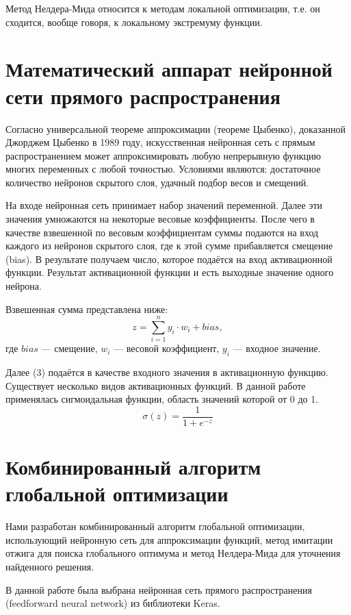 \documentclass[11pt, oneside, a4paper]{article}
\begin{document}
Метод Нелдера-Мида относится к методам локальной оптимизации, т.е. он сходится, вообще говоря, к локальному экстремуму функции. 

\section{Математический аппарат нейронной сети прямого распространения}

Согласно универсальной теореме аппроксимации (теореме Цыбенко), доказанной Джорджем Цыбенко в 1989 году, искусственная нейронная сеть с прямым распространением может аппроксимировать любую непрерывную функцию многих переменных с любой точностью. Условиями являются: достаточное количество нейронов скрытого слоя, удачный подбор весов и смещений.

На входе нейронная сеть принимает набор значений переменной. Далее эти значения умножаются на некоторые весовые коэффициенты. После чего в качестве взвешенной по весовым коэффициентам суммы подаются  на вход  каждого из нейронов скрытого слоя, где к этой сумме прибавляется смещение (bias). В результате получаем число, которое подаётся на вход активационной функции. Результат активационной функции и есть выходные значение одного нейрона.

Взвешенная сумма представлена ниже:
\begin{equation}
z = \sum_{i=1}^n y_i \cdot w_i + bias,
\end{equation}
где $bias$ --- смещение, $w_i$ --- весовой коэффициент, $y_i$ --- входное значение.

Далее (3) подаётся в качестве входного значения в активационную функцию. Существует несколько видов активационных функций. В данной работе применялась сигмоидальная функции, область значений которой от 0 до 1.
\begin{equation}
\sigma(z)= \frac{1}{1+e^{-z}}
\end{equation}

\section{Комбинированный алгоритм глобальной оптимизации}

Нами разработан комбинированный алгоритм глобальной оптимизации, использующий нейронную сеть для аппроксимации функций, метод имитации отжига для поиска глобального оптимума и метод Нелдера-Мида для уточнения найденного решения. 

В данной работе была выбрана нейронная сеть прямого распространения (feedforward neural network)\cite{fio_bib2,fio_bib3,fio_bib4,fio_bib5,fio_bib6,fio_bib7} из библиотеки Keras\cite{fio_bib15}. 
\end{document}

